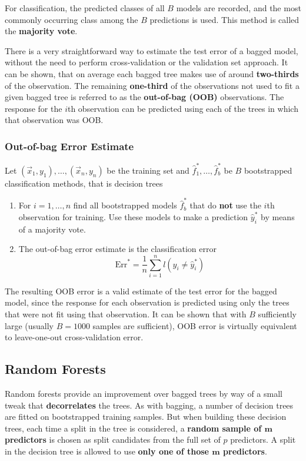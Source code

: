 \documentclass[11pt]{article}
\theoremstyle{definition}
\begin{document}
For classification, the predicted classes of all $B$ models are recorded, and the most commonly occurring class among the $B$ predictions is used. This method is called the \textbf{majority vote}.

There is a very straightforward way to estimate the test error of a bagged model, without the need to perform cross-validation or the validation set approach. It can be shown, that on average each bagged tree makes use of around \textbf{two-thirds} of the observation. The remaining \textbf{one-third} of the observations not used to fit a given bagged tree is referred to as the \textbf{out-of-bag (OOB)} observations. The response for the $i$th observation can be predicted using each of the trees in which that observation was OOB.

\newpage
\subsubsection{Out-of-bag Error Estimate}
\begin{definition}
	Let $(\vec{x}_1,y_1),\dots,(\vec{x}_n,y_n)$ be the training set and $\hat{f}_1^*,\dots,\hat{f}_b^*$ be $B$ bootstrapped classification methods, that is decision trees
	\begin{enumerate}
		\item For $i=1,\dots,n$ find all bootstrapped models $\hat{f}_b^*$ that do \textbf{not} use the $i$th observation for training. Use these models to make a prediction $\hat{y}_i^*$ by means of a majority vote.
		\item The out-of-bag error estimate is the classification error
		\begin{equation*}
			\text{Err}^* = \frac{1}{n}\sum_{i=1}^{n}l(y_i\neq \hat{y}_i^*)
		\end{equation*}
	\end{enumerate}
\end{definition}
The resulting OOB error is a valid estimate of the test error for the bagged model, since the response for each observation is predicted using only the trees that were not fit using that observation. It can be shown that with $B$ sufficiently large (usually $B=1000$ samples are sufficient), OOB error is virtually equivalent to leave-one-out cross-validation error.

\subsection{Random Forests}
Random forests provide an improvement over bagged trees by way of a small tweak that \textbf{decorrelates} the trees. As with bagging, a number of decision trees are fitted on bootstrapped training samples. But when building these decision trees, each time a split in the tree is considered, a \textbf{random sample of $\bm{m}$ predictors} is chosen as split candidates from the full set of $p$ predictors. A split in the decision tree is allowed to use \textbf{only one of those $\bm{m}$ predictors}.
\end{document}
